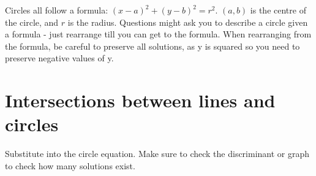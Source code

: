 Circles all follow a formula: \((x-a)^2 + (y-b)^2 = r^2\). \((a,b)\) is the centre of the circle, and \(r\) is the radius.
Questions might ask you to describe a circle given a formula - just rearrange till you can get to the formula.
When rearranging from the formula, be careful to preserve all solutions, as y is squared so you need to preserve negative values of y.

\section{Intersections between lines and circles}
Substitute into the circle equation. Make sure to check the discriminant or graph to check how many solutions exist.

